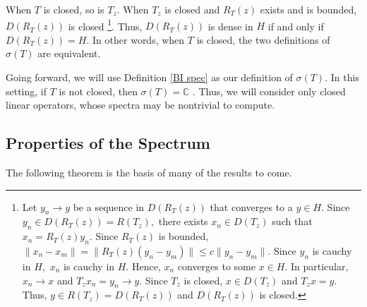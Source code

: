 \documentclass[12pt,a4paper]{article}
\theoremstyle{boldthm}
\theoremstyle{bolddefn}
\begin{document}



When $T$ is closed, so is $T_z.$ When $T_z$ is closed and $R_T(z)$ exists and is bounded, $D(R_T(z))$ is closed \footnote{Let $y_n \rightarrow y$ be a sequence in $D(R_T(z))$ that converges to a $y \in H.$ Since $y_n \in D(R_T(z)) = R(T_z),$ there exists $x_n \in D(T_z)$ such that $x_n = R_T(z) y_n.$ Since $R_T(z)$ is bounded, $\| x_n - x_m \| = \|R_T(z) ( y_n - y_m) \|\le c \| y_n - y_m \|.$ Since $y_n$ is cauchy in $H,$ $x_n$ is cauchy in $H.$ Hence, $x_n$ converges to some $x \in H.$ In particular, $x_n \rightarrow x$ and $T_z x_n  = y_n \rightarrow y.$ Since $T_z$ is closed, $x \in D(T_z)$ and $T_z x = y.$ Thus, $y \in R(T_z) = D(R_T(z))$ and $D(R_T(z))$ is closed.}. 
Thus, $D(R_T(z))$ is dense in $H$ if and only if $D(R_T(z)) = H.$ In other words, when $T$ is closed, the two definitions of $\sigma(T)$ are equivalent. 

Going forward, we will use Definition \ref{BI spec} as our definition of $\sigma(T).$ In this setting, if  $T$ is not closed, then $\sigma(T) = \mathbb{C}$ \cite{Matt}. Thus, we will consider only closed linear operators, whose spectra may be nontrivial to compute.


\subsection{Properties of the Spectrum}

The following theorem is the basis of many of the results to come. 
\end{document}
